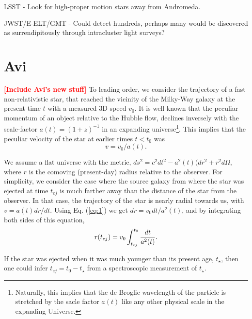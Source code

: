 \documentclass[a4paper,twocolumn]{emulateapj}
\newcommand{\colr}[1]{{\bf \textcolor{red}{[#1]}}}
\begin{document}
LSST - Look for high-proper motion stars away from Andromeda.

JWST/E-ELT/GMT - Could detect hundreds, perhaps many would be discovered as surrendipitously through intracluster light surveys?

\section{Avi}
\colr{Include Avi's new stuff}
To leading order, we consider the trajectory of a fast
non-relativistic star, that reached the vicinity of the Milky-Way
galaxy at the present time $t$ with a measured 3D speed $v_0$. It is
well-known that the peculiar momentum of an object relative to the
Hubble flow, declines inversely with the scale-factor
$a(t)=(1+z)^{-1}$ in an expanding universe\footnote{Naturally, this
implies that the de Broglie wavelength of the particle is stretched by
the sacle factor $a(t)$ like any other physical scale in the expanding
Universe.}. This implies that the peculiar velocity of the star at
earlier times $t<t_0$ was 
\begin{equation}
v=v_0/a(t).
\label{eq:1}
\end{equation}

We assume a flat universe with the metric,
$ds^2=c^2dt^2-a^2(t)(dr^2+r^2d\Omega$, where $r$ is the comoving
(present-day) radius relative to the observer. For simplicity, we
consider the case where the source galaxy from where the star was
ejected at time $t_{ej}$ is much farther away than the distance of the
star from the observer. In that case, the trajectory of the star is
nearly radial towards us, with $v=a(t)dr/dt$. Using Eq. (\ref{eq:1})
we get $dr=v_0 dt/a^2(t)$, and by integrating both sides of this
equation,
\begin{equation}
r(t_{ej})=v_0 \int_{t_{ej}}^{t_0} {dt \over a^2(t)} .
\label{eq:2}
\end{equation}

If the star was ejected when it was much younger than its present age,
$t_\star$, then one could infer $t_{ej}=t_0-t_\star$ from a
spectroscopic measurement of $t_\star$. 
\end{document}
